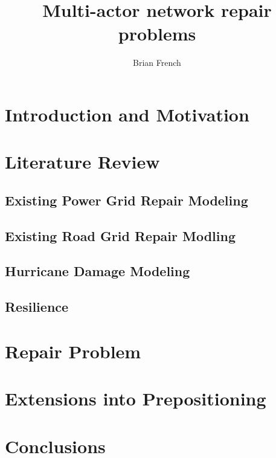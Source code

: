 \documentclass{article}
\begin{document}
	\title{Multi-actor network repair problems}
	\author{Brian French}
	\maketitle
	
	\section{Introduction and Motivation}
	\section{Literature Review}
	\subsection{Existing Power Grid Repair Modeling}
	\subsection{Existing Road Grid Repair Modling}
	\subsection{Hurricane Damage Modeling}
	\subsection{Resilience}
	\section{Repair Problem}
	\section{Extensions into Prepositioning}
	\section{Conclusions}
\end{document}
